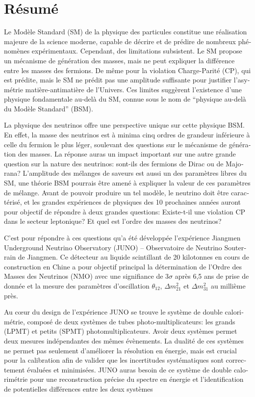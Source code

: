 \documentclass[../main.tex]{subfiles}
\begin{document}
\chapter*{Résumé}
\begin{otherlanguage}{french}

Le Modèle Standard (SM) de la physique des particules constitue une réalisation majeure de la science moderne, capable de décrire et de prédire de nombreux phénomènes expérimentaux. Cependant, des limitations subsistent. Le SM propose un mécanisme de génération des masses, mais ne peut expliquer la différence entre les masses des fermions. De même pour la violation Charge-Parité (CP), qui est prédite, mais le SM ne prédit pas une amplitude suffisante  pour justifier l'asymétrie matière-antimatière de l'Univers. Ces limites suggèrent l'existence d'une physique fondamentale au-delà du SM, connue sous le nom de ``physique au-delà du Modèle Standard'' (BSM).

La physique des neutrinos offre une perspective unique sur cette physique BSM. En effet, la masse des neutrinos est à minima cinq ordres de grandeur inférieure à celle du fermion le plus léger, soulevant des questions sur le mécanisme de génération des masses. La réponse auras un impact important sur une autre grande question sur la nature des neutrinos: sont-ils des fermions de Dirac ou de Majorana? L'amplitude des mélanges de saveurs est aussi un des paramètres libres du SM, une théorie BSM pourrais être amené à expliquer la valeur de ces paramètres de mélange. Avant de pouvoir produire un tel modèle, le neutrino doit être caractérisé, et les grandes expériences de physiques des 10 prochaines années auront pour objectif de répondre à deux grandes questions: Existe-t-il une violation CP dans le secteur leptonique? Et quel est l'ordre des masses des neutrinos?

\hfill

C'est pour répondre à ces questions qu'a été développée l'expérience Jiangmen Underground Neutrino Observatory (JUNO) -- Observatoire de Neutrino Souterrain de Jiangmen. Ce détecteur au liquide scintillant de 20 kilotonnes en cours de construction en Chine a pour objectif principal la détermination de l'Ordre des Masses des Neutrinos (NMO) avec une signifiance de 3$\sigma$ après 6,5 ans de prise de donnée et la mesure des paramètres d'oscillation $\theta_{12}$, $\Delta m^2_{21}$ et $\Delta m^2_{31}$ au millième près.

Au c\oe{}ur du design de l'expérience JUNO se trouve le système de double calorimétrie, composé de deux systèmes de tubes photo-multiplicateurs: les grands (LPMT) et petits (SPMT) photomultiplicateurs. Avoir deux systèmes permet deux mesures indépendantes des mêmes évènements. La dualité de ces systèmes ne permet pas seulement d'améliorer la résolution en énergie, mais est crucial pour la calibration afin de valider que les incertitudes systématiques sont correctement évaluées et minimisées. JUNO auras besoin de ce système de double calorimétrie pour une reconstruction précise du spectre en énergie et l'identification de potentielles différences entre les deux systèmes


\end{otherlanguage}
\end{document}

